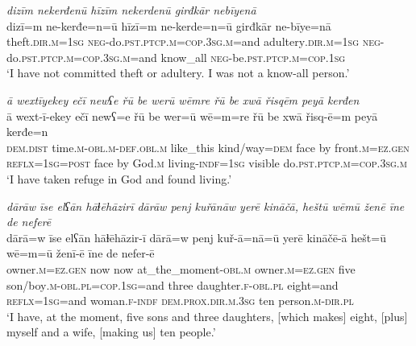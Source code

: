 \ea \label{ŽM.14}
\textit{dizīm nekerđenū hīzīm nekerdenū girđkār nebīyenā} \\ 
\gll dizī=m ne-kerđe=n=ū hīzī=m ne-kerde=n=ū girđkār ne-bīye=nā \\ 
 theft\textsc{.dir}\textsc{.m}\textsc{=\textsc{1sg}} \textsc{neg-}do\textsc{.pst}\textsc{.ptcp}\textsc{.m}\textsc{=cop}\textsc{.3sg}\textsc{.m}=and adultery\textsc{.dir}\textsc{.m}\textsc{=\textsc{1sg}} \textsc{neg-}do\textsc{.pst}\textsc{.ptcp}\textsc{.m}\textsc{=cop}\textsc{.3sg}\textsc{.m}=and know\_all \textsc{neg-}be\textsc{.pst}\textsc{.ptcp}\textsc{.m}\textsc{=cop}\textsc{.\textsc{1sg}} \\ 
\glt `I have not committed theft or adultery. I was not a know-all person.'
\z 
 
\ea \label{ŽM.15}
\textit{ā wextīyekey ečī newʕe řū be werū wēmre řū be xwā řisqēm peyā kerđen} \\ 
\gll ā wext-ī-ekey ečī newʕ=e řū be wer=ū wē=m=re řū be xwā řisq-ē=m peyā kerđe=n \\ 
 \textsc{dem.dist} time\textsc{.m}\textsc{-obl}\textsc{.m}\textsc{-def}\textsc{.obl}\textsc{.m} like\_this kind/way\textsc{=dem} face by front\textsc{.m}\textsc{=ez.gen} \textsc{reflx}\textsc{=\textsc{1sg}}\textsc{=\textsc{post}} face by God\textsc{.m} living\textsc{-indf}\textsc{=\textsc{1sg}} visible do\textsc{.pst}\textsc{.ptcp}\textsc{.m}\textsc{=cop}\textsc{.3sg}\textsc{.m} \\ 
\glt `I have taken refuge in God and found living.'
\z 
 
\ea \label{ŽM.16}
\textit{dārāw īse elʕān hāɫēhāzirī dārāw penj kuřānāw yerē kināčā, heštū wēmū ženē īne de neferē} \\ 
\gll dārā=w īse elʕān hāɫēhāzir-ī dārā=w penj kuř-ā=nā=ū yerē kināčē-ā hešt=ū wē=m=ū ženī-ē īne de nefer-ē \\ 
 owner\textsc{.m}\textsc{=ez.gen} now now at\_the\_moment\textsc{-obl}\textsc{.m} owner\textsc{.m}\textsc{=ez.gen} five son/boy\textsc{.m}\textsc{-obl}\textsc{.pl}\textsc{=cop}\textsc{.\textsc{1sg}}=and three daughter\textsc{.f}\textsc{-obl}\textsc{.pl} eight=and \textsc{reflx}\textsc{=\textsc{1sg}}=and woman\textsc{.f}\textsc{-indf} \textsc{dem.prox}\textsc{.dir}\textsc{.m}\textsc{.3sg} ten person\textsc{.m}\textsc{-dir}\textsc{.pl} \\ 
\glt `I have, at the moment, five sons and three daughters, [which makes] eight, [plus] myself and a wife, [making us] ten people.'
\z 
 
